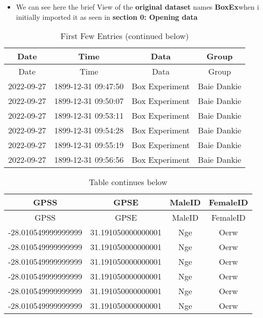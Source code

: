 \documentclass[
]{article}
\providecommand{\tightlist}{%
  \setlength{\itemsep}{0pt}\setlength{\parskip}{0pt}}
\begin{document}
\begin{itemize}
\tightlist
\item
  We can see here the brief View of the \textbf{original dataset} names
  \textbf{BoxEx}when i initially imported it as seen in \textbf{section
  0: Opening data}
\end{itemize}

\begin{longtable}[]{@{}cccc@{}}
\caption{First Few Entries (continued below)}\tabularnewline
\toprule
Date & Time & Data & Group \\
\midrule
\endfirsthead
\toprule
Date & Time & Data & Group \\
\midrule
\endhead
2022-09-27 & 1899-12-31 09:47:50 & Box Experiment & Baie Dankie \\
2022-09-27 & 1899-12-31 09:50:07 & Box Experiment & Baie Dankie \\
2022-09-27 & 1899-12-31 09:53:11 & Box Experiment & Baie Dankie \\
2022-09-27 & 1899-12-31 09:54:28 & Box Experiment & Baie Dankie \\
2022-09-27 & 1899-12-31 09:55:19 & Box Experiment & Baie Dankie \\
2022-09-27 & 1899-12-31 09:56:56 & Box Experiment & Baie Dankie \\
\bottomrule
\end{longtable}

\begin{longtable}[]{@{}cccc@{}}
\caption{Table continues below}\tabularnewline
\toprule
GPSS & GPSE & MaleID & FemaleID \\
\midrule
\endfirsthead
\toprule
GPSS & GPSE & MaleID & FemaleID \\
\midrule
\endhead
-28.010549999999999 & 31.191050000000001 & Nge & Oerw \\
-28.010549999999999 & 31.191050000000001 & Nge & Oerw \\
-28.010549999999999 & 31.191050000000001 & Nge & Oerw \\
-28.010549999999999 & 31.191050000000001 & Nge & Oerw \\
-28.010549999999999 & 31.191050000000001 & Nge & Oerw \\
-28.010549999999999 & 31.191050000000001 & Nge & Oerw \\
\bottomrule
\end{longtable}
\end{document}
